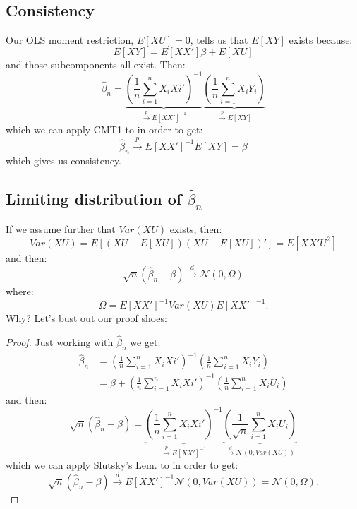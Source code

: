 \documentclass{tufte-book}
\theoremstyle{mytheoremstyle}
\theoremstyle{mylemstyle}
\theoremstyle{mydefstyle}
\begin{document}
\subsection{Consistency}
Our OLS moment restriction, \(E[XU] = 0\), tells us that \(E[XY]\) exists because:
	\[E[XY] = E[XX']\beta + E[XU]\]
and those subcomponents all exist. Then:
	\[\hat{\beta}_n = \underbrace{\left(\frac{1}{n}\sum_{i=1}^n X_iXi'\right)^{-1}}_\textrm{\(\overset{p}{\rightarrow} E[XX']^{-1}\)} \underbrace{\left(\frac{1}{n}\sum_{i=1}^nX_iY_i\right)}_\textrm{\(\overset{p}{\rightarrow} E[XY]\)}\]
which we can apply CMT1 to in order to get:
	\[\hat{\beta}_n \overset{p}{\rightarrow} E[XX']^{-1}E[XY] = \beta\]
which gives us consistency. 

\subsection{Limiting distribution of \(\hat{\beta}_n\)}
If we assume further that \(Var(XU)\) exists, then:
	\[Var(XU) = E[(XU - E[XU])(XU - E[XU])'] = E[XX'U^2]\]
and then:
	\[\sqrt{n}(\hat{\beta}_n - \beta) \overset{d}{\rightarrow} \mathcal{N}(0, \Omega)\]
where:
	\[\Omega = E[XX']^{-1}Var(XU)E[XX']^{-1} \text{.}\]
Why? Let's bust out our proof shoes:
\begin{proof} Just working with \(\hat{\beta}_n\) we get:
	\begin{align*}
		\hat{\beta}_n & = \left(\frac{1}{n}\sum_{i=1}^n X_iXi'\right)^{-1}\left(\frac{1}{n}\sum_{i=1}^nX_iY_i\right) \\
					& = \beta + \left(\frac{1}{n}\sum_{i=1}^n X_iXi'\right)^{-1}\left(\frac{1}{n}\sum_{i=1}^nX_iU_i\right)
	\end{align*}
and then:
	\[\sqrt{n}(\hat{\beta}_n - \beta) = \underbrace{\left(\frac{1}{n}\sum_{i=1}^n X_iXi'\right)^{-1}}_\textrm{\(\overset{p}{\rightarrow} E[XX']^{-1}\)}\underbrace{\left(\frac{1}{\sqrt{n}}\sum_{i=1}^nX_iU_i\right)}_\textrm{\(\overset{d}{\rightarrow} \mathcal{N}(0, Var(XU))\)}\]
which we can apply Slutsky's Lem. to in order to get:
	\[\sqrt{n}(\hat{\beta}_n - \beta) \overset{d}{\rightarrow} E[XX']^{-1}\mathcal{N}(0, Var(XU)) = \mathcal{N}(0, \Omega)\text{.}\]
\end{proof}
\end{document}
